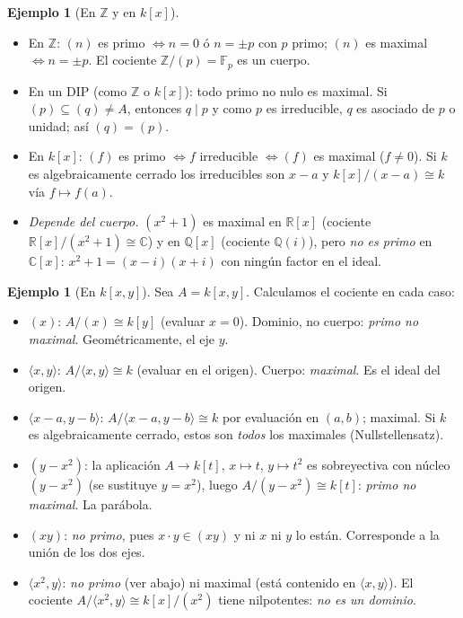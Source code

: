 \documentclass[11pt,a4paper]{article}
\newcommand{\ZZ}{\mathbb{Z}}
\newcommand{\QQ}{\mathbb{Q}}
\newcommand{\RR}{\mathbb{R}}
\newcommand{\CC}{\mathbb{C}}
\newcommand{\FF}{\mathbb{F}}
\newcommand{\gen}[1]{\langle #1\rangle}
\theoremstyle{plain}
\theoremstyle{definition}
\newtheorem{ejemplo}[teorema]{Ejemplo}
\theoremstyle{remark}
\newcounter{ej}
\begin{document}
\begin{ejemplo}[{En $\ZZ$ y en $k[x]$}]\label{ej:primos1}
\begin{itemize}[itemsep=2pt]
\item En $\ZZ$: $(n)$ es primo $\iff n=0$ ó $n=\pm p$ con $p$ primo; $(n)$ es maximal $\iff n=\pm p$. El cociente $\ZZ/(p)=\FF_p$ es un cuerpo.
\item En un DIP (como $\ZZ$ o $k[x]$): todo primo no nulo es maximal. Si $(p)\subseteq(q)\ne A$, entonces $q\mid p$ y como $p$ es irreducible, $q$ es asociado de $p$ o unidad; así $(q)=(p)$.
\item En $k[x]$: $(f)$ es primo $\iff f$ irreducible $\iff(f)$ es maximal ($f\ne0$). Si $k$ es algebraicamente cerrado los irreducibles son $x-a$ y $k[x]/(x-a)\cong k$ vía $f\mapsto f(a)$.
\item \emph{Depende del cuerpo.} $(x^2+1)$ es maximal en $\RR[x]$ (cociente $\RR[x]/(x^2+1)\cong\CC$) y en $\QQ[x]$ (cociente $\QQ(i)$), pero \emph{no es primo} en $\CC[x]$: $x^2+1=(x-i)(x+i)$ con ningún factor en el ideal.
\end{itemize}
\end{ejemplo}

\begin{ejemplo}[{En $k[x,y]$}]\label{ej:primos2}
Sea $A=k[x,y]$. Calculamos el cociente en cada caso:
\begin{itemize}[itemsep=2pt]
\item $(x)$: $A/(x)\cong k[y]$ (evaluar $x=0$). Dominio, no cuerpo: \emph{primo no maximal}. Geométricamente, el eje $y$.
\item $\gen{x,y}$: $A/\gen{x,y}\cong k$ (evaluar en el origen). Cuerpo: \emph{maximal}. Es el ideal del origen.
\item $\gen{x-a,y-b}$: $A/\gen{x-a,y-b}\cong k$ por evaluación en $(a,b)$; maximal. Si $k$ es algebraicamente cerrado, estos son \emph{todos} los maximales (Nullstellensatz).
\item $(y-x^2)$: la aplicación $A\to k[t]$, $x\mapsto t$, $y\mapsto t^2$ es sobreyectiva con núcleo $(y-x^2)$ (se sustituye $y=x^2$), luego $A/(y-x^2)\cong k[t]$: \emph{primo no maximal}. La parábola.
\item $(xy)$: \emph{no primo}, pues $x\cdot y\in(xy)$ y ni $x$ ni $y$ lo están. Corresponde a la unión de los dos ejes.
\item $\gen{x^2,y}$: \emph{no primo} (ver abajo) ni maximal (está contenido en $\gen{x,y}$). El cociente $A/\gen{x^2,y}\cong k[x]/(x^2)$ tiene nilpotentes: \emph{no es un dominio}.
\end{itemize}
\end{ejemplo}
\end{document}
